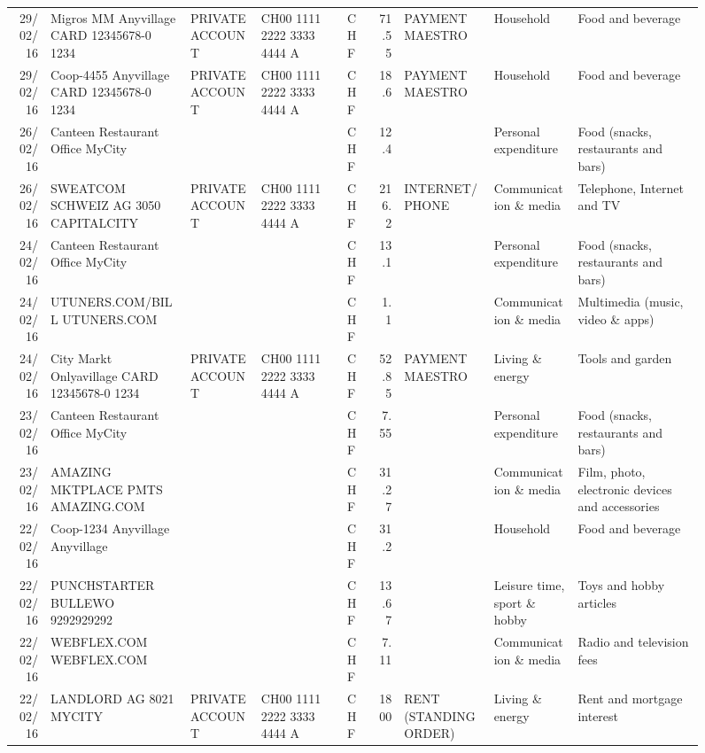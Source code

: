 \begin{landscape}
\begin{sidewaysfigure}
\begin{table}[h]
\begin{center}
\begin{tabular}{rllllrlll}
		29/02/16 & Migros MM Anyvillage CARD 12345678-0 1234 & PRIVATE ACCOUNT & CH00 1111 2222 3333 4444 A & CHF   & 71.55 & PAYMENT MAESTRO & Household & Food and beverage \\
		29/02/16 & Coop-4455 Anyvillage CARD 12345678-0 1234 & PRIVATE ACCOUNT & CH00 1111 2222 3333 4444 A & CHF   & 18.6  & PAYMENT MAESTRO & Household & Food and beverage \\
		26/02/16 & Canteen Restaurant Office      MyCity &       &       & CHF   & 12.4  &       & Personal expenditure & Food (snacks, restaurants and bars) \\
		26/02/16 & SWEATCOM SCHWEIZ AG 3050 CAPITALCITY & PRIVATE ACCOUNT & CH00 1111 2222 3333 4444 A & CHF   & 216.2 & INTERNET/PHONE & Communication \& media & Telephone,  Internet and TV \\
		24/02/16 & Canteen Restaurant Office      MyCity &       &       & CHF   & 13.1  &       & Personal expenditure & Food (snacks, restaurants and bars) \\
		24/02/16 & UTUNERS.COM/BILL          UTUNERS.COM &       &       & CHF   & 1.1   &       & Communication \& media & Multimedia (music, video \& apps) \\
		24/02/16 & City Markt Onlyavillage CARD 12345678-0 1234 & PRIVATE ACCOUNT & CH00 1111 2222 3333 4444 A & CHF   & 52.85 & PAYMENT MAESTRO & Living \& energy & Tools and garden \\
		23/02/16 & Canteen Restaurant Office      MyCity &       &       & CHF   & 7.55  &       & Personal expenditure & Food (snacks, restaurants and bars) \\
		23/02/16 & AMAZING MKTPLACE PMTS     AMAZING.COM &       &       & CHF   & 31.27 &       & Communication \& media & Film, photo, electronic devices and accessories \\
		22/02/16 & Coop-1234 Anyvillage    Anyvillage &       &       & CHF   & 31.2  &       & Household & Food and beverage \\
		22/02/16 & PUNCHSTARTER BULLEWO   9292929292 &       &       & CHF   & 13.67 &       & Leisure time, sport \& hobby & Toys and hobby articles \\
		22/02/16 & WEBFLEX.COM              WEBFLEX.COM &       &       & CHF   & 7.11  &       & Communication \& media & Radio and television fees \\
		22/02/16 & LANDLORD AG 8021 MYCITY & PRIVATE ACCOUNT & CH00 1111 2222 3333 4444 A & CHF   & 1800  & RENT (STANDING ORDER) & Living \& energy & Rent and mortgage interest \\

\end{tabular}
\end{center}
\end{table}
\end{sidewaysfigure}
\end{landscape}
